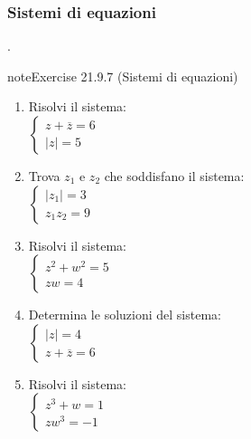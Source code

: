 \documentclass[letterpaper,10pt,italian]{jupyterBook}
\begin{document}
\subsubsection{Sistemi di equazioni}
\label{\detokenize{ch/algebra/complex-algebra-problems:sistemi-di-equazioni}}\label{\detokenize{ch/algebra/complex-algebra-problems:math-hs-algebra-complex-problems-equations-sys}}
\sphinxAtStartPar
{\hyperref[\detokenize{ch/algebra/complex-algebra-sol:math-hs-algebra-complex-sol-equations-sys-sol}]{}}.
 \label{exercise:ch/algebra/complex-algebra-problems-exercise-6}

\begin{sphinxadmonition}{note}{Exercise 21.9.7 (Sistemi di equazioni)}


\begin{enumerate}
%
\item {} 
\sphinxAtStartPar
Risolvi il sistema:\\
\(\begin{cases} 
z + \overline{z} = 6 \\
|z| = 5 
\end{cases}\)

\item {} 
\sphinxAtStartPar
Trova \(z_1\) e \(z_2\) che soddisfano il sistema:\\
\(\begin{cases} 
|z_1| = 3 \\
z_1 z_2 = 9 
\end{cases}\)

\item {} 
\sphinxAtStartPar
Risolvi il sistema:\\
\(\begin{cases} 
z^2 + w^2 = 5 \\
z w = 4 
\end{cases}\)

\item {} 
\sphinxAtStartPar
Determina le soluzioni del sistema:\\
\(\begin{cases} 
|z| = 4 \\
z + \overline{z} = 6 
\end{cases}\)

\item {} 
\sphinxAtStartPar
Risolvi il sistema:\\
\(\begin{cases} 
z^3 + w = 1 \\
z w^3 = -1 
\end{cases}\)


\end{enumerate}
\end{sphinxadmonition}
\end{document}
